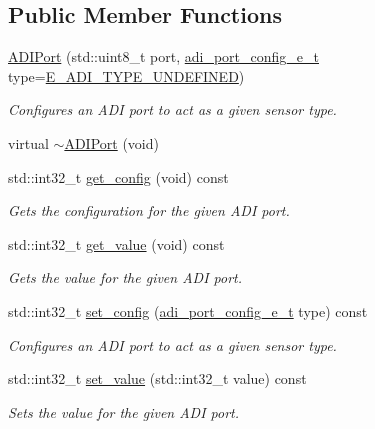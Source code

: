 \subsection*{Public Member Functions}
\begin{DoxyCompactItemize}
\item 
\mbox{\hyperlink{classpros_1_1ADIPort_ab6ef7710de366895859d770ffb1d8cf1}{A\+D\+I\+Port}} (std\+::uint8\+\_\+t port, \mbox{\hyperlink{adi_8h_a4efff81399e823764aa05cd5c172ea55}{adi\+\_\+port\+\_\+config\+\_\+e\+\_\+t}} type=\mbox{\hyperlink{adi_8h_ad5f9ddf0fd9de73c4b23fa5485144b7fa37e9d6ebc03d88c58db1904a7f2b7373}{E\+\_\+\+A\+D\+I\+\_\+\+T\+Y\+P\+E\+\_\+\+U\+N\+D\+E\+F\+I\+N\+ED}})
\begin{DoxyCompactList}\small\item\em Configures an A\+DI port to act as a given sensor type. \end{DoxyCompactList}\item 
virtual \mbox{\hyperlink{classpros_1_1ADIPort_ab100339f40f975055431cc8a5aed310a}{$\sim$\+A\+D\+I\+Port}} (void)
\item 
std\+::int32\+\_\+t \mbox{\hyperlink{classpros_1_1ADIPort_a1227bc815b12d2789cb78f6d3dcaf37b}{get\+\_\+config}} (void) const
\begin{DoxyCompactList}\small\item\em Gets the configuration for the given A\+DI port. \end{DoxyCompactList}\item 
std\+::int32\+\_\+t \mbox{\hyperlink{classpros_1_1ADIPort_ac79b5fd3ce67ae6ffc4b1fbbb306e997}{get\+\_\+value}} (void) const
\begin{DoxyCompactList}\small\item\em Gets the value for the given A\+DI port. \end{DoxyCompactList}\item 
std\+::int32\+\_\+t \mbox{\hyperlink{classpros_1_1ADIPort_abd86653eebbc34b863ace81839f7e40c}{set\+\_\+config}} (\mbox{\hyperlink{adi_8h_a4efff81399e823764aa05cd5c172ea55}{adi\+\_\+port\+\_\+config\+\_\+e\+\_\+t}} type) const
\begin{DoxyCompactList}\small\item\em Configures an A\+DI port to act as a given sensor type. \end{DoxyCompactList}\item 
std\+::int32\+\_\+t \mbox{\hyperlink{classpros_1_1ADIPort_ae6711117fbceb3bb6e3602c4ef63aff1}{set\+\_\+value}} (std\+::int32\+\_\+t value) const
\begin{DoxyCompactList}\small\item\em Sets the value for the given A\+DI port. \end{DoxyCompactList}\end{DoxyCompactItemize}
